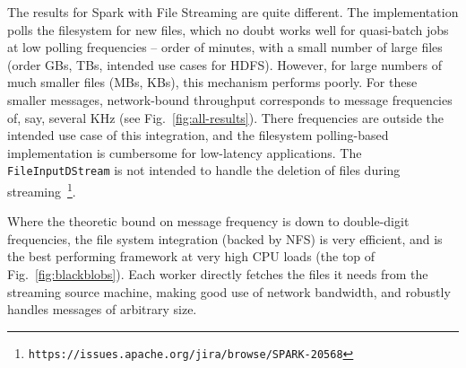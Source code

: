 \documentclass[conference]{IEEEtran}
\begin{document}
The results for Spark with File Streaming are quite different. The implementation polls the filesystem for new files, which no doubt works well for quasi-batch jobs at low polling frequencies -- order of minutes, with a small number of large files (order GBs, TBs, intended use cases for HDFS). However, for large numbers of much smaller files (MBs, KBs), this mechanism performs poorly. For these smaller messages, network-bound throughput corresponds to message frequencies of, say, several KHz (see Fig.~\ref{fig:all-results}). There frequencies are outside the intended use case of this integration, and the filesystem polling-based implementation is cumbersome for low-latency applications. %
The \texttt{FileInputDStream} is not intended to handle the deletion of files during streaming~\footnote{\texttt{https://issues.apache.org/jira/browse/SPARK-20568}}.

Where the theoretic bound on message frequency is down to double-digit frequencies, %
the file system integration (backed by NFS) is very efficient, and is the best performing framework at very high CPU loads (the top of Fig.~\ref{fig:blackblobs}). Each worker directly fetches the files it needs from the streaming source machine, making good use of network bandwidth, and robustly handles messages of arbitrary size. 
\end{document}
